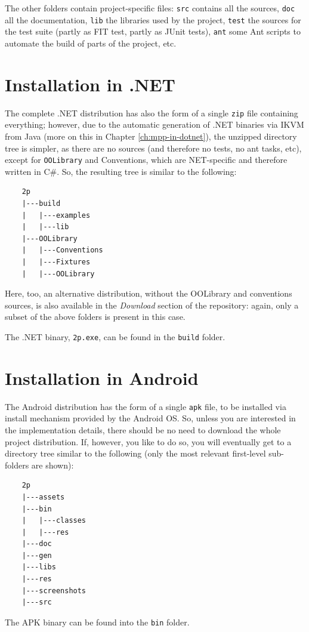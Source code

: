 The other folders contain project-specific files: \texttt{src} contains all the sources, \texttt{doc} all the documentation, \texttt{lib} the libraries used by the \tuprolog{} project, \texttt{test} the sources for the \tuprolog{} test suite (partly as FIT test, partly as JUnit tests), \texttt{ant} some Ant scripts to automate the build of parts of the \tuprolog{} project, etc.


\section{Installation in .NET}

The complete .NET distribution has also the form of a single \texttt{zip} file containing everything; however, due to the automatic generation of \tuprolog{} .NET binaries via IKVM from Java (more on this in Chapter \ref{ch:mpp-in-dotnet}), the unzipped directory tree is simpler, as there are no sources (and therefore no tests, no ant tasks, etc), except for \texttt{OOLibrary} and Conventions, which are NET-specific and therefore written in C\#.
%
So, the resulting tree is similar to the following:
%
\begin{verbatim}
    2p
    |---build
    |   |---examples
    |   |---lib
    |---OOLibrary
    |   |---Conventions
    |   |---Fixtures
    |   |---OOLibrary
\end{verbatim}
%
Here, too, an alternative distribution, without the OOLibrary and conventions sources, is also available in the \textit{Download} section of the \tuprolog{} repository: again, only a subset of the above folders is present in this case.

The .NET binary, \texttt{2p.exe}, can be found in the \texttt{build} folder.


\section{Installation in Android}

The Android distribution has the form of a single \texttt{apk} file, to be installed via install mechanism provided by the Android OS.
So, unless you are interested in the implementation details, there should be no need to download the whole project distribution.
If, however, you like to do so, you will eventually get to a directory tree similar to the following (only the most relevant first-level sub-folders are shown):
%
\begin{verbatim}
    2p
    |---assets
    |---bin
    |   |---classes
    |   |---res
    |---doc
    |---gen
    |---libs
    |---res
    |---screenshots
    |---src
\end{verbatim}
%
The APK binary can be found into the \texttt{bin} folder.

